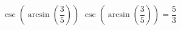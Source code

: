  {$\csc\left(\arcsin\left(\dfrac{3}{5}\right)\right)$}
{ $\csc\left(\arcsin\left(\dfrac{3}{5}\right)\right) = \dfrac{5}{3}$}
